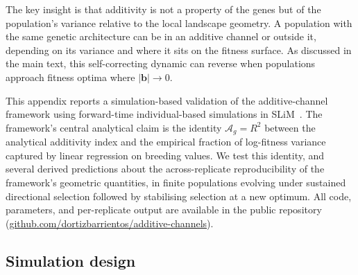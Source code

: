 \documentclass[9pt,twocolumn,twoside,lineno]{gsajnl}
\newcommand{\vect}[1]{\boldsymbol{#1}}
\newcommand{\Ag}{\ensuremath{\mathcal{A}_{g}}\xspace}
\begin{document}
The key insight is that additivity is not a property of the genes but of the population's variance relative to the local landscape geometry. A population with the same genetic architecture can be in an additive channel or outside it, depending on its variance and where it sits on the fitness surface. As discussed in the main text, this self-correcting dynamic can reverse when populations approach fitness optima where $|\vect{b}| \to 0$.


\setcounter{figure}{0}
\renewcommand{\thefigure}{S5.\arabic{figure}}

This appendix reports a simulation-based validation of the additive-channel framework using forward-time individual-based simulations in SLiM~\citep{HallerMesser2019}. The framework's central analytical claim is the identity \mbox{$\Ag = R^2$} between the analytical additivity index and the empirical fraction of log-fitness variance captured by linear regression on breeding values. We test this identity, and several derived predictions about the across-replicate reproducibility of the framework's geometric quantities, in finite populations evolving under sustained directional selection followed by stabilising selection at a new optimum. All code, parameters, and per-replicate output are available in the public repository (\href{https://github.com/dortizbarrientos/additive-channels}{github.com/dortizbarrientos/additive-channels}).

\subsection*{Simulation design}
\end{document}
